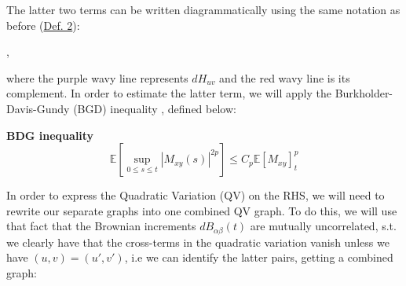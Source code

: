 \documentclass[11pt]{article}
\newenvironment{boxtheorem}[1]
  {\begin{mdframed}\noindent\textbf{#1}\itshape\space}
  {\end{mdframed}}
\begin{document}
\noindent The latter two terms can be written diagrammatically using the same notation as before (\hyperref[def2]{Def. 2}):
\begin{center}
 ,
\end{center}
where the purple wavy line represents $dH_{uv}$ and the red wavy line is its complement. In order to estimate the latter term, we will apply the Burkholder-Davis-Gundy (BGD) inequality \cite{bdg}, defined below:
\begin{boxtheorem}{\centering BDG inequality}
$$\mathbb{E}\left[\sup_{0\leq s\leq t}\left\vert M_{xy}(s)\right\vert^{2p}\right]\leq C_p\mathbb{E}\left[ M_{xy} \right]_t^p$$
\end{boxtheorem}
In order to express the Quadratic Variation (QV) on the RHS, we will need to rewrite our separate graphs into one combined QV graph. To do this, we will use that fact that the Brownian increments $dB_{\alpha\beta}(t)$ are mutually uncorrelated, s.t. we clearly have that the cross-terms in the quadratic variation vanish unless we have $(u, v) = (u', v')$, i.e we can identify the latter pairs, getting a combined graph:
\end{document}
